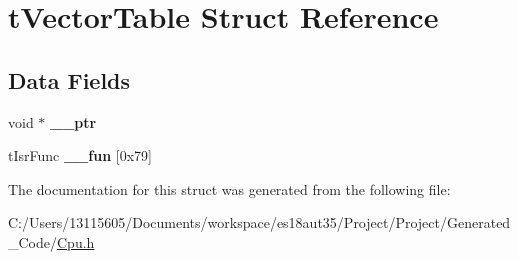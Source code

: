 \hypertarget{structt_vector_table}{}\section{t\+Vector\+Table Struct Reference}
\label{structt_vector_table}
\subsection*{Data Fields}
\begin{DoxyCompactItemize}
\item 
\hypertarget{structt_vector_table_a324d365e9c8c6c033f4edbc906f94844}{}void $\ast$ {\bfseries \+\_\+\+\_\+ptr}\label{structt_vector_table_a324d365e9c8c6c033f4edbc906f94844}

\item 
\hypertarget{structt_vector_table_a6001c7c57c392674cadaf831203e4606}{}t\+Isr\+Func {\bfseries \+\_\+\+\_\+fun} \mbox{[}0x79\mbox{]}\label{structt_vector_table_a6001c7c57c392674cadaf831203e4606}

\end{DoxyCompactItemize}


The documentation for this struct was generated from the following file\+:\begin{DoxyCompactItemize}
\item 
C\+:/\+Users/13115605/\+Documents/workspace/es18aut35/\+Project/\+Project/\+Generated\+\_\+\+Code/\hyperlink{_cpu_8h}{Cpu.\+h}\end{DoxyCompactItemize}
